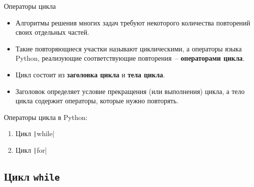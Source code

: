 \documentclass[aspectratio=169]{beamer}	%
\begin{document}
\begin{frame}[fragile]{Операторы цикла}
\scriptsize	
\begin{itemize}
	\item Алгоритмы решения многих задач требуют некоторого количества повторений своих отдельных частей.
	\item Такие повторяющиеся участки называют циклическими, а операторы языка Python, реализующие соответствующие повторения~-- \textcolor{extraorange}{\textbf{операторами цикла}}.
	\item Цикл состоит из \textcolor{extraorange}{\textbf{заголовка цикла}} и \textcolor{extraorange}{\textbf{тела цикла}}.
	\item Заголовок определяет условие прекращения (или выполнения) цикла, а тело цикла содержит операторы, которые нужно повторять.
\end{itemize}

\bigskip	
Операторы цикла в Python:
\begin{enumerate}
	\item Цикл \texttt|while|
	\item Цикл \texttt|for|
\end{enumerate}
\vfill
\end{frame}

\subsection{Цикл \texttt{while}}
\end{document}
